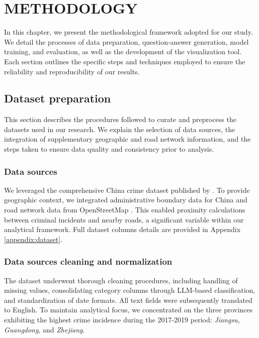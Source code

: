 \chapter{ METHODOLOGY}

\noindent
In this chapter, we present the methodological framework adopted for our study. We detail the processes of data preparation, question-answer generation, model training, and evaluation, as well as the development of the visualization tool. Each section outlines the specific steps and techniques employed to ensure the reliability and reproducibility of our results.

\section{Dataset preparation}

\noindent
This section describes the procedures followed to curate and preprocess the datasets used in our research. We explain the selection of data sources, the integration of supplementary geographic and road network information, and the steps taken to ensure data quality and consistency prior to analysis.

\subsection{Data sources}

We leveraged the comprehensive China crime dataset published by \cite{Zhang2025CrimeDatasetChina}. To provide geographic context, we integrated administrative boundary data for China \citep{GeoJSON2025China} and road network data from OpenStreetMap \citep{Vargas2021OSM}. This enabled proximity calculations between criminal incidents and nearby roads, a significant variable within our analytical framework. Full dataset columns details are provided in Appendix \ref{appendix:dataset}.

\subsection{Data sources cleaning and normalization}

The dataset underwent thorough cleaning procedures, including handling of missing values, consolidating category columns through LLM-based classification, and standardization of date formats. All text fields were subsequently translated to English. To maintain analytical focus, we concentrated on the three provinces exhibiting the highest crime incidence during the 2017-2019 period: \textit{Jiangsu}, \textit{Guangdong}, and \textit{Zhejiang}.

